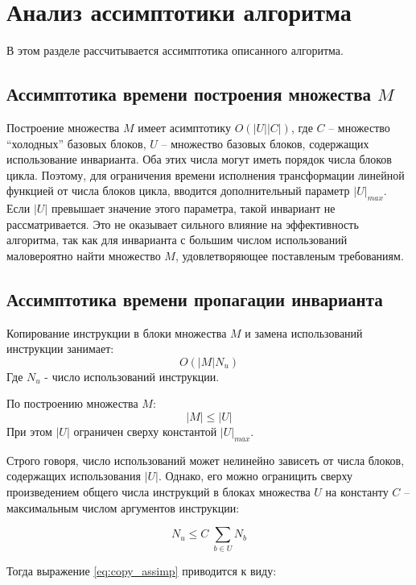 \section{Анализ ассимптотики алгоритма}

В этом разделе рассчитывается ассимптотика описанного алгоритма.

\subsection{Ассимптотика времени построения множества $M$}
Построение множества $M$ имеет асимптотику $ O(|U| |C|) $, где $C$ -- множество \enquote{холодных} базовых блоков, $U$ -- множество базовых блоков, содержащих использование инварианта.
Оба этих числа могут иметь порядок числа блоков цикла.
Поэтому, для ограничения времени исполнения трансформации линейной функцией от числа блоков цикла, вводится дополнительный параметр $|U|_{max}$.
Если $|U|$ превышает значение этого параметра, такой инвариант не рассматривается.
Это не оказывает сильного влияние на эффективность алгоритма, так как для инварианта с большим числом использований маловероятно найти множество $M$, удовлетворяющее поставленым требованиям.

\subsection{Ассимптотика времени пропагации инварианта}

Копирование инструкции в блоки множества $M$ и замена использований инструкции занимает:
\begin{equation} \label{eq:copy_assimp}
    O(|M| N_u)
\end{equation}
Где $N_u$ - число использований инструкции.

По построению множества $M$:
$$ |M| \leq |U| $$
При этом $|U|$ ограничен сверху константой $|U|_{max}$.

Строго говоря, число использований может нелинейно зависеть от числа блоков, содержащих использования $|U|$.
Однако, его можно ограницить сверху произведением общего числа инструкций в блоках множества $U$ на константу $C$ -- максимальным числом аргументов инструкции:

\begin{equation} \label{eq:sum_leq_one}
N_u \leq C \; \sum_{b \in U} N_b
\end{equation}

Тогда выражение \ref{eq:copy_assimp} приводится к виду:

